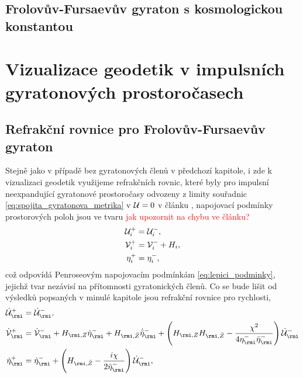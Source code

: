 \subsection{Frolovův-Fursaevův gyraton s kosmologickou konstantou}

\section{Vizualizace geodetik v impulsních gyratonových prostoročasech}
\subsection{Refrakční rovnice pro Frolovův-Fursaevův gyraton}
Stejně jako v případě bez gyratonových členů v předchozí kapitole, i zde k vizualizaci geodetik využijeme refrakčních rovnic,
které byly pro impulsní neexpandující gyratonové prostoročasy odvozeny z limity souřadnic \eqref{eq:spojita_gyratonova_metrika}
v $\mathcal{U} = 0$ v článku \cite{Podolsky_2017}, napojovací podmínky prostorových poloh jsou ve tvaru \textcolor{red}{jak upozornit na chybu ve článku?}
\begin{equation}
    \begin{split}
        \mathcal{U}_{i}^{+} &= \mathcal{U}_{i}^{-}, \\
        \mathcal{V}_{i}^{+} &= \mathcal{V}_{i}^{-} + H_{i}, \\
        \eta_{i}^{+} &= \eta_{i}^{-},
    \end{split}
\end{equation}
což odpovídá Penroseovým napojovacím podmínkám \eqref{eq:lepici_podminky},
jejichž tvar nezávisí na přítomnosti gyratonických členů. Co se bude lišit od
výsledků popsaných v minulé kapitole jsou refrakční rovnice pro rychlosti,
\begin{equation}
    \label{eq:refrakcni_rovnice_gyra_rychlosti}
    \begin{split}
        \dot{\matu}_{\rmi}^{+} &= \dot{\matu}_{\rmi}^{-}, \\
        \dot{\matv}_{\rmi}^{+} &= \dot{\matv}_{\rmi}^{-} + H_{\rmi, Z} \dot{\eta}_{\rmi}^{-} + H_{\rmi, \bar{Z}} \dot{\bar{\eta}}_{\rmi}^{-} + \left(H_{\rmi, Z} H_{\rmi, \bar{Z}} - \frac{\chi^2}{4 \eta_{\rmi}^{-} \bar{\eta}_{\rmi}^{-}}\right) \dot{\matu}_{\rmi}^{-} \\
        \dot{\eta}_{\rmi}^{+} &= \dot{\eta}_{\rmi}^{-} + \left(H_{\rmi, \bar{Z}} - \frac{i \chi}{2 \bar{\eta}_{\rmi}^{-}}\right) \dot{\matu}_{\rmi}^{-},
    \end{split} 
\end{equation}
